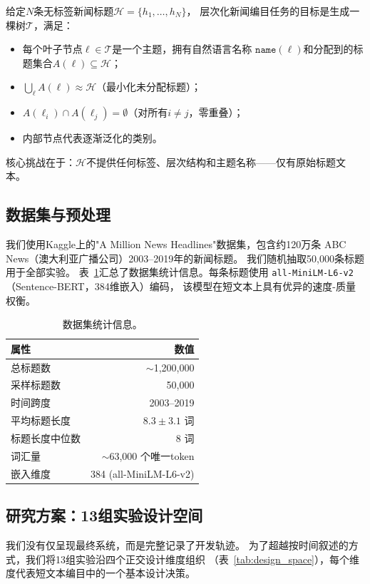 \documentclass[10pt,twocolumn,twoside]{ctexart}
\begin{document}
给定$N$条无标签新闻标题$\mathcal{H} = \{h_1, \ldots, h_N\}$，
层次化新闻编目任务的目标是生成一棵树$\mathcal{T}$，满足：
\begin{itemize}[nosep]
    \item 每个叶子节点$\ell \in \mathcal{T}$是一个主题，拥有自然语言名称
    $\texttt{name}(\ell)$和分配到的标题集合$A(\ell) \subseteq \mathcal{H}$；
    \item $\bigcup_{\ell} A(\ell) \approx \mathcal{H}$（最小化未分配标题）；
    \item $A(\ell_i) \cap A(\ell_j) = \emptyset$（对所有$i \neq j$，零重叠）；
    \item 内部节点代表逐渐泛化的类别。
\end{itemize}
核心挑战在于：$\mathcal{H}$不提供任何标签、层次结构和主题名称——仅有原始标题文本。

\subsection{数据集与预处理}
我们使用Kaggle上的"A Million News Headlines"数据集，包含约120万条
ABC News（澳大利亚广播公司）2003--2019年的新闻标题。
我们随机抽取50,000条标题用于全部实验。
表~\ref{tab:dataset}汇总了数据集统计信息。每条标题使用
\texttt{all-MiniLM-L6-v2}（Sentence-BERT，384维嵌入）编码，
该模型在短文本上具有优异的速度-质量权衡。

\begin{table}[h]
\centering
\caption{数据集统计信息。}
\label{tab:dataset}
\small
\begin{tabular}{lr}
\toprule
属性 & 数值 \\
\midrule
总标题数 & $\sim$1,200,000 \\
采样标题数 & 50,000 \\
时间跨度 & 2003--2019 \\
平均标题长度 & $8.3 \pm 3.1$ 词 \\
标题长度中位数 & 8 词 \\
词汇量 & $\sim$63,000 个唯一token \\
嵌入维度 & 384 (all-MiniLM-L6-v2) \\
\bottomrule
\end{tabular}
\end{table}

\subsection{研究方案：13组实验设计空间}
我们没有仅呈现最终系统，而是完整记录了开发轨迹。
为了超越按时间叙述的方式，我们将13组实验沿四个正交设计维度组织
（表~\ref{tab:design_space}），每个维度代表短文本编目中的一个基本设计决策。
\end{document}

